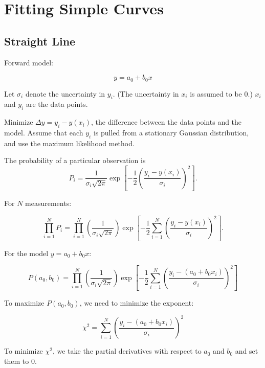 \section{Fitting Simple Curves}

\subsection{Straight Line}

Forward model:

\begin{equation*}
    y = a_0 + b_0 x
\end{equation*}

Let $\sigma_i$ denote the uncertainty in $y_i$. (The uncertainty in $x_i$ is assumed to be 0.) $x_i$ and $y_i$ are the data points.

Minimize $\Delta y = y_i - y(x_i)$, the difference between the data points and the model. Assume that each $y_i$ is pulled from a stationary Gaussian distribution, and use the maximum likelihood method.

The probability of a particular observation is
\begin{equation*}
    P_i = \frac{1}{\sigma_i \sqrt{2\pi}} \exp\left[-\frac{1}{2}\left(\frac{y_i - y(x_i)}{\sigma_i}\right)^2\right]\text{.}
\end{equation*}

For $N$ measurements:

\begin{equation*}
    \prod_{i=1}^{N} P_i = \prod_{i=1}^{N}\left(\frac{1}{ \sigma_i \sqrt{2\pi}}\right) \exp\left[-\frac{1}{2}\sum_{i=1}^{N}\left(\frac{y_i - y(x_i)}{\sigma_i}\right)^2\right]\text{.}
\end{equation*}

For the model $y = a_0 + b_0 x$:

\begin{equation*}
    P(a_0, b_0) = \prod_{i=1}^{N}\left(\frac{1}{ \sigma_i \sqrt{2\pi}}\right) \exp\left[-\frac{1}{2}\sum_{i=1}^{N}\left(\frac{y_i - (a_0 + b_0 x_i)}{\sigma_i}\right)^2\right]
\end{equation*}

To maximize $P(a_0, b_0)$, we need to minimize the exponent:

\begin{equation*}
    \chi^2 = \sum_{i=1}^{N}\left(\frac{y_i - (a_0 + b_0 x_i)}{\sigma_i}\right)^2
\end{equation*}

To minimize $\chi^2$, we take the partial derivatives with respect to $a_0$ and $b_0$ and set them to 0.

